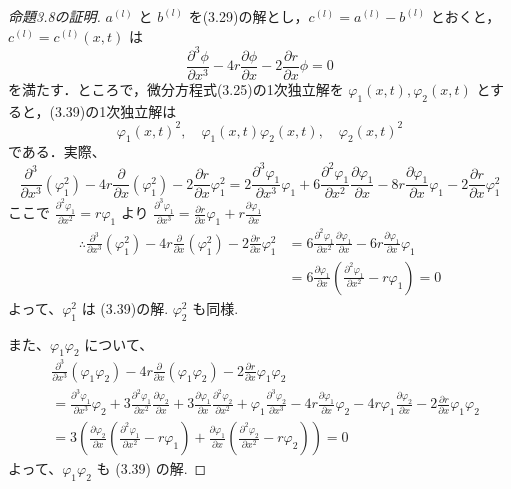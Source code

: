 \begin{story}
\begin{proof}[命題3.8の証明]
$a^{(l)}$ と $b^{(l)}$ を(3.29)の解とし，$c^{(l)} = a^{(l)} - b^{(l)}$ とおくと，$c^{(l)} = c^{(l)}(x,t)$ は
\begin{equation}
    \frac{\partial^3 \phi}{\partial x^3} - 4r\frac{\partial \phi}{\partial x} - 2\frac{\partial r}{\partial x}\phi = 0 \label{eq:3.39}
\end{equation}
を満たす．ところで，微分方程式(3.25)の1次独立解を $\varphi_1(x,t), \varphi_2(x,t)$ とすると，(3.39)の1次独立解は
\begin{equation*}
    \varphi_1(x,t)^2, \quad \varphi_1(x,t)\varphi_2(x,t), \quad \varphi_2(x,t)^2
\end{equation*}
である．実際、
\begin{equation*}
    \frac{\partial^3}{\partial x^3}(\varphi_1^2) - 4r\frac{\partial}{\partial x}(\varphi_1^2) - 2\frac{\partial r}{\partial x}\varphi_1^2 = 2\frac{\partial^3 \varphi_1}{\partial x^3}\varphi_1 + 6\frac{\partial^2 \varphi_1}{\partial x^2}\frac{\partial \varphi_1}{\partial x} - 8r\frac{\partial \varphi_1}{\partial x}\varphi_1 - 2\frac{\partial r}{\partial x}\varphi_1^2
\end{equation*}
ここで $\frac{\partial^2 \varphi_1}{\partial x^2} = r\varphi_1$ より $\frac{\partial^3 \varphi_1}{\partial x^3} = \frac{\partial r}{\partial x}\varphi_1 + r\frac{\partial \varphi_1}{\partial x}$
\begin{align*}
    \therefore \frac{\partial^3}{\partial x^3}(\varphi_1^2) - 4r\frac{\partial}{\partial x}(\varphi_1^2) - 2\frac{\partial r}{\partial x}\varphi_1^2 &= 6\frac{\partial^2 \varphi_1}{\partial x^2}\frac{\partial \varphi_1}{\partial x} - 6r\frac{\partial \varphi_1}{\partial x}\varphi_1 \\
    &= 6\frac{\partial \varphi_1}{\partial x}\left(\frac{\partial^2 \varphi_1}{\partial x^2} - r\varphi_1\right) = 0
\end{align*}
よって、$\varphi_1^2$ は (3.39)の解. $\varphi_2^2$ も同様.

また、$\varphi_1\varphi_2$ について、
\begin{align*}
    & \frac{\partial^3}{\partial x^3}(\varphi_1\varphi_2) - 4r\frac{\partial}{\partial x}(\varphi_1\varphi_2) - 2\frac{\partial r}{\partial x}\varphi_1\varphi_2 \\
    &= \frac{\partial^3 \varphi_1}{\partial x^3}\varphi_2 + 3\frac{\partial^2 \varphi_1}{\partial x^2}\frac{\partial \varphi_2}{\partial x} + 3\frac{\partial \varphi_1}{\partial x}\frac{\partial^2 \varphi_2}{\partial x^2} + \varphi_1\frac{\partial^3 \varphi_2}{\partial x^3} - 4r\frac{\partial \varphi_1}{\partial x}\varphi_2 - 4r\varphi_1\frac{\partial \varphi_2}{\partial x} - 2\frac{\partial r}{\partial x}\varphi_1\varphi_2 \\
    &= 3\left( \frac{\partial \varphi_2}{\partial x}\left(\frac{\partial^2 \varphi_1}{\partial x^2} - r\varphi_1\right) + \frac{\partial \varphi_1}{\partial x}\left(\frac{\partial^2 \varphi_2}{\partial x^2} - r\varphi_2\right) \right) = 0
\end{align*}
よって、$\varphi_1\varphi_2$ も (3.39) の解.


\end{proof}
\end{story}
